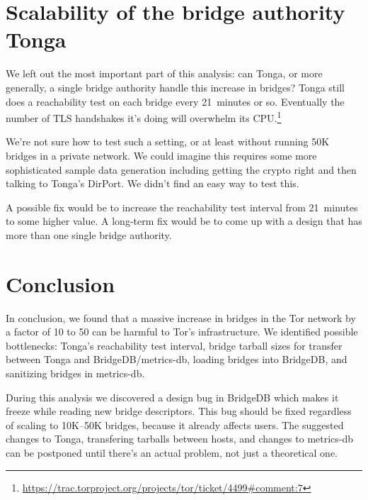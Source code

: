 \documentclass{article}
\begin{document}
\section{Scalability of the bridge authority Tonga}

We left out the most important part of this analysis:
can Tonga, or more generally, a single bridge authority handle this
increase in bridges?
Tonga still does a reachability test on each bridge every 21~minutes or so.
Eventually the number of TLS handshakes it's doing will overwhelm its
CPU.\footnote{%
\url{https://trac.torproject.org/projects/tor/ticket/4499#comment:7}}

We're not sure how to test such a setting, or at least without running 50K
bridges in a private network.
We could imagine this requires some more sophisticated sample data
generation including getting the crypto right and then talking to Tonga's
DirPort.
We didn't find an easy way to test this.

A possible fix would be to increase the reachability test interval from
21~minutes to some higher value.
A long-term fix would be to come up with a design that has more than one
single bridge authority.

\section{Conclusion}

In conclusion, we found that a massive increase in bridges in the Tor
network by a factor of 10 to 50 can be harmful to Tor's infrastructure.
We identified possible bottlenecks: Tonga's reachability test interval,
bridge tarball sizes for transfer between Tonga and BridgeDB/metrics-db,
loading bridges into BridgeDB, and sanitizing bridges in metrics-db.

During this analysis we discovered a design bug in BridgeDB which makes it
freeze while reading new bridge descriptors.
This bug should be fixed regardless of scaling to 10K--50K bridges,
because it already affects users.
The suggested changes to Tonga, transfering tarballs between hosts, and
changes to metrics-db can be postponed until there's an actual problem,
not just a theoretical one.
\end{document}
